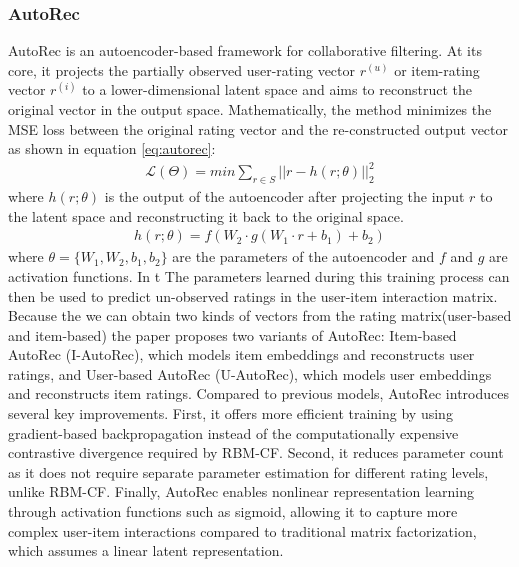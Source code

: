 \documentclass{ieeetj}
\begin{document}
\subsubsection{AutoRec\cite{sedhain2015autorec}}
AutoRec is an autoencoder-based framework for collaborative filtering. At its core, it projects the partially observed user-rating vector $r^{(u)}$ or item-rating vector $r^{(i)}$ to a lower-dimensional latent space and aims to reconstruct the original vector in the output space. 
Mathematically, the method minimizes the MSE loss between the original rating vector and the re-constructed output vector as shown in equation \ref{eq:autorec}:
\begin{equation}
\label{eq:autorec}
\begin{aligned}
	\mathcal{L}(\Theta) = min \sum_{r \in S} ||r - h(r; \theta)||_2^2
\end{aligned}
\end{equation}
where $h(r;\theta)$ is the output of the autoencoder after projecting the input $r$ to the latent space and reconstructing it back to the original space. 
\begin{equation}
\label{eq:h function}
\begin{aligned}
	h(r; \theta) = f(W_2 \cdot g(W_1 \cdot r + b_1) + b_2)
\end{aligned}
\end{equation}
where $\theta = \{W_1, W_2, b_1, b_2\}$ are the parameters of the autoencoder and $f$ and $g$ are activation functions. In t
The parameters learned during this training process can then be used to predict un-observed ratings in the user-item interaction matrix. Because the we can obtain two kinds of vectors from the rating matrix(user-based and item-based) the paper proposes two variants of AutoRec: Item-based AutoRec (I-AutoRec), which models item embeddings and reconstructs user ratings, and User-based AutoRec (U-AutoRec), which models user embeddings and reconstructs item ratings. Compared to previous models, AutoRec introduces several key improvements. First, it offers more efficient training by using gradient-based backpropagation instead of the computationally expensive contrastive divergence required by RBM-CF. Second, it reduces parameter count as it does not require separate parameter estimation for different rating levels, unlike RBM-CF. Finally, AutoRec enables nonlinear representation learning through activation functions such as sigmoid, allowing it to capture more complex user-item interactions compared to traditional matrix factorization, which assumes a linear latent representation.
\end{document}
